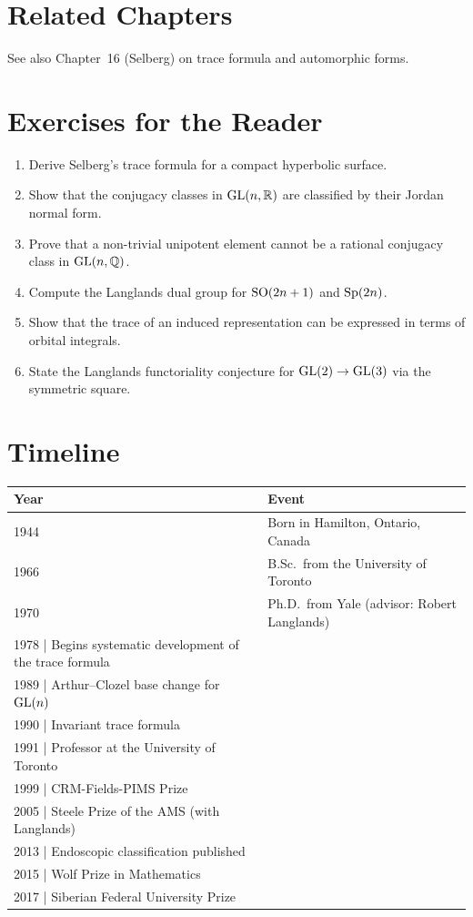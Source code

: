 \section{Related Chapters}
See also Chapter~16 (Selberg) on trace formula and automorphic forms.

\section*{Exercises for the Reader}

\begin{enumerate}
    \item [A] Derive Selberg's trace formula for a compact hyperbolic surface.
    \item [B] Show that the conjugacy classes in $\operatorname{GL}(n,\mathbb{R})$ are classified by their Jordan normal form.
    \item [I] Prove that a non-trivial unipotent element cannot be a rational conjugacy class in $\operatorname{GL}(n,\mathbb{Q})$.
    \item [I] Compute the Langlands dual group for $\operatorname{SO}(2n+1)$ and $\operatorname{Sp}(2n)$.
    \item [I] Show that the trace of an induced representation can be expressed in terms of orbital integrals.
    \item [B] State the Langlands functoriality conjecture for $\operatorname{GL}(2) \to \operatorname{GL}(3)$ via the symmetric square.
\end{enumerate}

\section*{Timeline}

\begin{tabularx}{\linewidth}{|p{1.5cm}|>{\raggedright\arraybackslash}X|}
\hline
\textbf{Year} & \textbf{Event} \\ \hline
1944 & Born in Hamilton, Ontario, Canada \\ \hline
1966 & B.Sc.\ from the University of Toronto \\ \hline
1970 & Ph.D.\ from Yale (advisor: Robert Langlands) \\ \hline
1978 | Begins systematic development of the trace formula \\ \hline
1989 | Arthur--Clozel base change for $\operatorname{GL}(n)$ \\ \hline
1990 | Invariant trace formula \\ \hline
1991 | Professor at the University of Toronto \\ \hline
1999 | CRM-Fields-PIMS Prize \\ \hline
2005 | Steele Prize of the AMS (with Langlands) \\ \hline
2013 | Endoscopic classification published \\ \hline
2015 | Wolf Prize in Mathematics \\ \hline
2017 | Siberian Federal University Prize \\ \hline
\end{tabularx}

